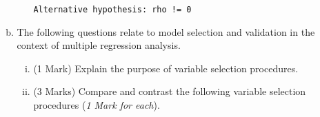 \begin{enumerate}
\begin{enumerate}[(a)]
\begin{enumerate}[(i)]
\begin{framed}
\begin{verbatim}
Alternative hypothesis: rho != 0
\end{verbatim}
\end{framed}
\end{enumerate}





\item The following questions relate to model selection and validation in the context of multiple
regression analysis.
\begin{enumerate}[(i)]
\item (1 Mark) Explain the purpose of variable selection procedures.
\item (3 Marks) Compare and contrast the following variable selection procedures (\textit{1 Mark for each}).
\begin{itemize}


\end{itemize}
\end{enumerate}
\end{enumerate}
\end{enumerate}
